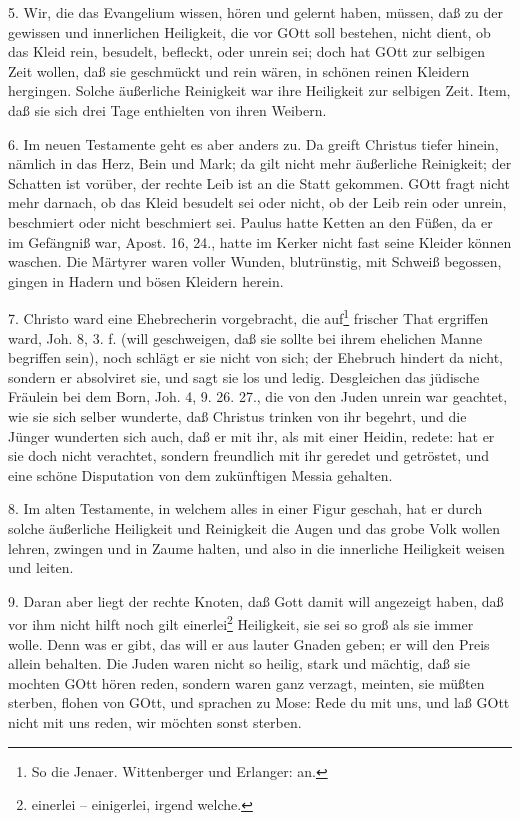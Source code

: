 5. Wir, die das Evangelium wissen, hören und gelernt haben, müssen, daß zu der gewissen und innerlichen Heiligkeit, die vor GOtt soll bestehen, nicht dient, ob das Kleid rein, besudelt, befleckt, oder unrein sei; doch hat GOtt zur selbigen Zeit wollen, daß sie geschmückt und rein wären, in schönen reinen Kleidern hergingen. Solche äußerliche Reinigkeit war ihre Heiligkeit zur selbigen Zeit. Item, daß sie sich drei Tage enthielten von ihren Weibern.

6. Im neuen Testamente geht es aber anders zu. Da greift Christus tiefer hinein, nämlich in das Herz, Bein und Mark; da gilt nicht mehr äußerliche Reinigkeit; der Schatten ist vorüber, der rechte Leib ist an die Statt gekommen. GOtt fragt nicht mehr darnach, ob das Kleid besudelt sei oder nicht, ob der Leib rein oder unrein, beschmiert oder nicht beschmiert sei. Paulus hatte Ketten an den Füßen, da er im Gefängniß war, Apost. 16, 24., hatte im Kerker nicht fast seine Kleider können waschen. Die Märtyrer waren voller Wunden, blutrünstig, mit Schweiß begossen, gingen in Hadern und bösen Kleidern herein.

7. Christo ward eine Ehebrecherin vorgebracht, die auf\footnote{So die Jenaer. Wittenberger und Erlanger: an.} frischer That ergriffen ward, Joh. 8, 3. f. (will geschweigen, daß sie sollte bei ihrem ehelichen Manne begriffen sein), noch schlägt er sie nicht von sich; der Ehebruch hindert da nicht, sondern er absolviret sie, und sagt sie los und ledig. Desgleichen das jüdische Fräulein bei dem Born, Joh. 4, 9. 26. 27., die von den Juden unrein war geachtet, wie sie sich selber wunderte, daß Christus trinken von ihr begehrt, und die Jünger wunderten sich auch, daß er mit ihr, als mit einer Heidin, redete: hat er sie doch nicht verachtet, sondern freundlich mit ihr geredet und getröstet, und eine schöne Disputation von dem zukünftigen Messia gehalten.

8. Im alten Testamente, in welchem alles in einer Figur geschah, hat er durch solche äußerliche Heiligkeit und Reinigkeit die Augen und das grobe Volk wollen lehren, zwingen und in Zaume halten, und also in die innerliche Heiligkeit weisen und leiten.

9. Daran aber liegt der rechte Knoten, daß Gott damit will angezeigt haben, daß vor ihm nicht hilft noch gilt einerlei\footnote{einerlei – einigerlei, irgend welche.} Heiligkeit, sie sei so groß als sie immer wolle. Denn was er gibt, das will er aus lauter Gnaden geben; er will den Preis allein behalten. Die Juden waren nicht so heilig, stark und mächtig, daß sie mochten GOtt hören reden, sondern waren ganz verzagt, meinten, sie müßten sterben, flohen von GOtt, und sprachen zu Mose: Rede du mit uns, und laß GOtt nicht mit uns reden, wir möchten sonst sterben.

